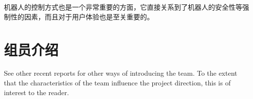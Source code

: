 机器人的控制方式也是一个非常重要的方面，它直接关系到了机器人的安全性等强制性的因素，而且对于用户体验也是至关重要的。



\section{组员介绍}
\label{sec:team}

\begin{remark} \color{blue}
See other recent reports for other ways of introducing the team. To the extent that the characteristics of the team influence the project direction, this is of interest to the reader.
\end{remark} \normalcolor




